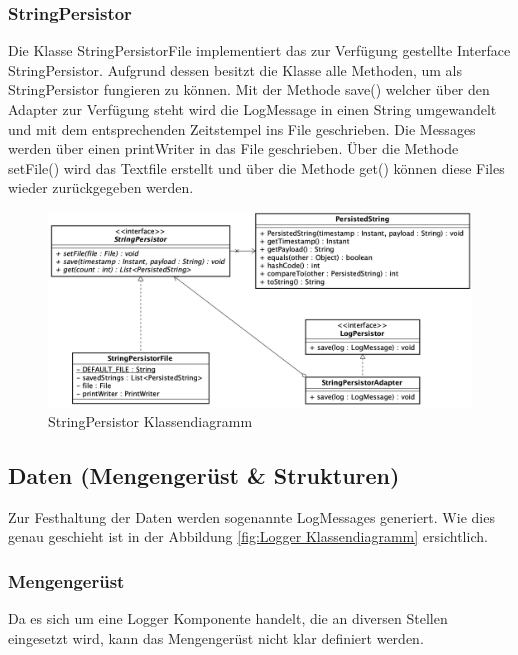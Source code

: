 \newpage
\subsubsection{StringPersistor}
Die Klasse StringPersistorFile implementiert das zur Verfügung gestellte Interface StringPersistor. Aufgrund dessen besitzt die Klasse alle Methoden, um als StringPersistor fungieren zu können.
Mit der Methode save() welcher über den Adapter zur Verfügung steht wird die LogMessage in einen String umgewandelt und mit dem entsprechenden Zeitstempel ins File geschrieben. Die Messages werden über einen printWriter in das File geschrieben. Über die Methode setFile() wird das Textfile erstellt und über die Methode get() können diese Files wieder zurückgegeben werden. 

\begin{figure}[H]
	\centering
	\includegraphics[width=\textwidth]{2_Architektur/Bilder/stringPersistor.png}
	\caption{StringPersistor Klassendiagramm}
	\label{fig:StringPersistor Klassendiagramm}
\end{figure}

\newpage
\subsection{Daten (Mengengerüst \& Strukturen)}
Zur Festhaltung der Daten werden sogenannte LogMessages generiert. Wie dies genau geschieht ist in der Abbildung \ref{fig:Logger Klassendiagramm} ersichtlich.

\subsubsection{Mengengerüst}
Da es sich um eine Logger Komponente handelt, die an diversen Stellen eingesetzt wird, kann das Mengengerüst nicht klar definiert werden.

